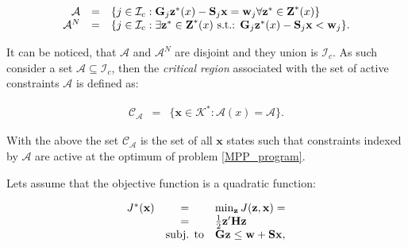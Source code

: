     \begin{equation}
    \begin{array}{rcl}
            \mathcal{A}&=&\{j\in\mathcal{I}_c:\textbf{G}_j\textbf{z}^*(x)-\textbf{S}_j\textbf{x}=\textbf{w}_j\forall\textbf{z}^*\in\textbf{Z}^*(x)\}\\
            \mathcal{A}^N&=&\{j\in\mathcal{I}_c:\exists\textbf{z}^*\in\textbf{Z}^*(x)\textnormal{ s.t.: }\textbf{G}_j\textbf{z}^*(x)-\textbf{S}_j\textbf{x}<\textbf{w}_j\}.
        \end{array}
        \label{BASICMPC:equ:MPP_stateset_optimal partition}
    \end{equation}

    It can be noticed, that $\mathcal{A}$ and $\mathcal{A}^N$ are disjoint and they union is $\mathcal{I}_c$. As such consider a set $\mathcal{A}\subseteq\mathcal{I}_c$, then the \emph{critical region} associated with the set of active constraints $\mathcal{A}$ is defined as:

    \begin{equation}
    \begin{array}{rcl}
            \mathcal{C}_{\mathcal{A}}&=&\{\textbf{x}\in\mathcal{K}^*:\mathcal{A}(x)=\mathcal{A}\}.
        \end{array}
        \label{BASICMPC:equ:MPP_stateset_optimal critical}
    \end{equation}

    With the above the set $\mathcal{C}_{\mathcal{A}}$ is the set of all $\textbf{x}$ states such that constraints indexed by $\mathcal{A}$ are active at the optimum of problem \ref{MPP_program}.

    \label{BASICCSR:sec:MPP_QP}

    Lets assume that the objective function is a quadratic function:

    \begin{equation}
    \begin{array}{rcl}
            J^*(\textbf{x})&=&\min_{\textbf{z}}J(\textbf{z},\textbf{x})=\\
            &=&\frac{1}{2}\textbf{z}'\textbf{H}\textbf{z}\\
            &\textnormal{subj. to}&\textbf{Gz}\leq\textbf{w}+\textbf{Sx},
        \end{array}
        \label{BASICMPC:equ:MPP_quadratic}
    \end{equation}

